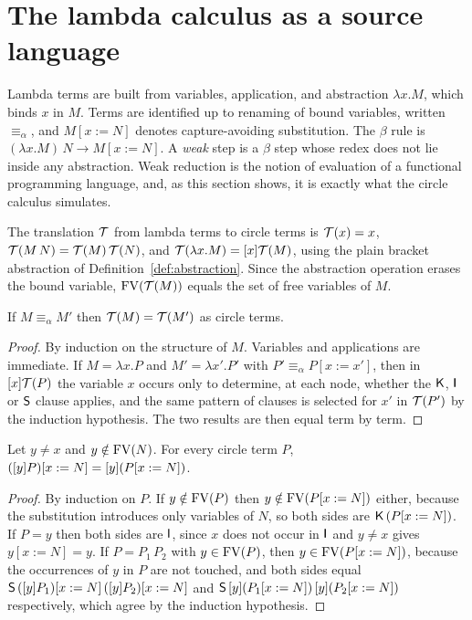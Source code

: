 \section{The lambda calculus as a source language}\label{sec:lambda}

Lambda terms are built from variables, application, and abstraction $\lambda x.M$, which binds $x$ in $M$. Terms are identified up to renaming of bound variables, written $\equiv_\alpha$, and $M[x:=N]$ denotes capture-avoiding substitution. The $\beta$ rule is $(\lambda x.M)\,N\to M[x:=N]$. A \emph{weak} step is a $\beta$ step whose redex does not lie inside any abstraction. Weak reduction is the notion of evaluation of a functional programming language, and, as this section shows, it is exactly what the circle calculus simulates.

\begin{definition}[Translation]\label{def:translation}
The translation $\mathcal{T}$ from lambda terms to circle terms is $\mathcal{T}(x)=x$, $\mathcal{T}(M\,N)=\mathcal{T}(M)\,\mathcal{T}(N)$, and $\mathcal{T}(\lambda x.M)=[x]\mathcal{T}(M)$, using the plain bracket abstraction of Definition~\ref{def:abstraction}. Since the abstraction operation erases the bound variable, $\mathrm{FV}(\mathcal{T}(M))$ equals the set of free variables of $M$.
\end{definition}

\begin{lemma}\label{lem:alpha}
If $M\equiv_\alpha M'$ then $\mathcal{T}(M)=\mathcal{T}(M')$ as circle terms.
\end{lemma}

\begin{proof}
By induction on the structure of $M$. Variables and applications are immediate. If $M=\lambda x.P$ and $M'=\lambda x'.P'$ with $P'\equiv_\alpha P[x:=x']$, then in $[x]\mathcal{T}(P)$ the variable $x$ occurs only to determine, at each node, whether the $\mathsf{K}$, $\mathsf{I}$ or $\mathsf{S}$ clause applies, and the same pattern of clauses is selected for $x'$ in $\mathcal{T}(P')$ by the induction hypothesis. The two results are then equal term by term.
\end{proof}

\begin{lemma}\label{lem:abscommute}
Let $y\ne x$ and $y\notin\mathrm{FV}(N)$. For every circle term $P$, $([y]P)[x:=N]=[y](P[x:=N])$.
\end{lemma}

\begin{proof}
By induction on $P$. If $y\notin\mathrm{FV}(P)$ then $y\notin\mathrm{FV}(P[x:=N])$ either, because the substitution introduces only variables of $N$, so both sides are $\mathsf{K}\,(P[x:=N])$. If $P=y$ then both sides are $\mathsf{I}$, since $x$ does not occur in $\mathsf{I}$ and $y\neq x$ gives $y[x:=N]=y$. If $P=P_1\,P_2$ with $y\in\mathrm{FV}(P)$, then $y\in\mathrm{FV}(P[x:=N])$, because the occurrences of $y$ in $P$ are not touched, and both sides equal $\mathsf{S}\,([y]P_1)[x:=N]\,([y]P_2)[x:=N]$ and $\mathsf{S}\,[y](P_1[x:=N])\,[y](P_2[x:=N])$ respectively, which agree by the induction hypothesis.
\end{proof}

